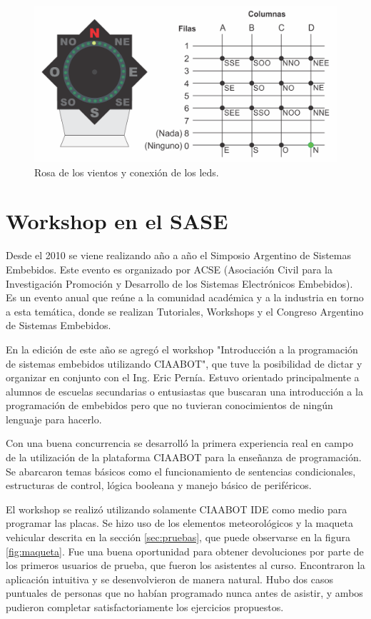 \begin{figure}[H]
\centering
\includegraphics[scale=.6]{./Figures/rosa-vientos.png}
\caption{Rosa de los vientos y conexión de los leds.}
\label{fig:rosaVientos}
\end{figure}

\section{Workshop en el SASE}
Desde el 2010 se viene realizando año a año el Simposio Argentino de Sistemas Embebidos. Este evento es organizado por ACSE (Asociación Civil para la Investigación Promoción y Desarrollo de los Sistemas Electrónicos Embebidos). Es un evento anual que reúne a la comunidad académica y a la industria  en torno a esta temática, donde se realizan Tutoriales, Workshops y el Congreso Argentino de Sistemas Embebidos. 

En la edición de este año se agregó el workshop "Introducción a la programación de sistemas embebidos utilizando CIAABOT", que tuve la posibilidad de dictar y organizar en conjunto con el Ing. Eric Pernía. Estuvo orientado principalmente a alumnos de escuelas secundarias o entusiastas que buscaran una introducción a la programación de embebidos pero que no tuvieran conocimientos de ningún lenguaje para hacerlo.

Con una buena concurrencia se desarrolló la primera experiencia real en campo de la utilización de la plataforma CIAABOT para la enseñanza de programación. Se abarcaron temas básicos como el funcionamiento de sentencias condicionales, estructuras de control, lógica booleana y manejo básico de periféricos.

El workshop se realizó utilizando solamente CIAABOT IDE como medio para programar las placas. Se hizo uso de los elementos meteorológicos y la maqueta vehicular descrita en la sección \ref{sec:pruebas}, que puede observarse en la figura \ref{fig:maqueta}. Fue una buena oportunidad para obtener devoluciones por parte de los primeros usuarios de prueba, que fueron los asistentes al curso. Encontraron la aplicación intuitiva y se desenvolvieron de manera natural. Hubo dos casos puntuales de personas que no habían programado nunca antes de asistir, y ambos pudieron completar satisfactoriamente los ejercicios propuestos.


